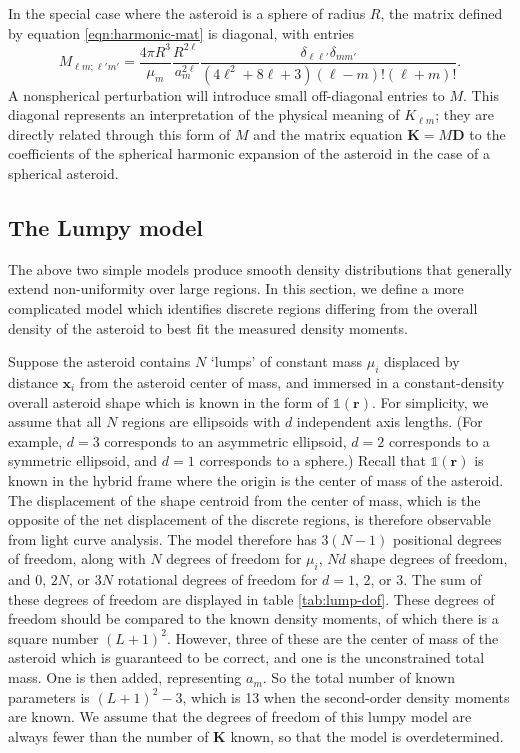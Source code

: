 \documentclass[fleqn,usenatbib]{mnras}
\begin{document}
In the special case where the asteroid is a sphere of radius $R$, the matrix defined by equation \ref{eqn:harmonic-mat} is diagonal, with entries 
\begin{equation}
  M_{\ell m; \ell' m'} = \frac{4\pi R^3}{\mu_m} \frac{R^{2\ell}}{a_m^{2\ell}} \frac{\delta_{\ell \ell'} \delta_{m m'}}{(4\ell^2 + 8\ell + 3)(\ell - m)!(\ell+m)!}.
\end{equation}
A nonspherical perturbation will introduce small off-diagonal entries to $M$. This diagonal represents an interpretation of the physical meaning of $K_{\ell m}$; they are directly related through this form of $M$ and the matrix equation $\bm K = M \bm D$ to the coefficients of the spherical harmonic expansion of the asteroid in the case of a spherical asteroid.



\subsection{The Lumpy model}

The above two simple models produce smooth density distributions that generally extend non-uniformity over large regions. In this section, we define a more complicated model which identifies discrete regions differing from the overall density of the asteroid to best fit the measured density moments.

Suppose the asteroid contains $N$ `lumps' of constant mass $\mu_i$ displaced by distance $\bm x_i$ from the asteroid center of mass, and immersed in a constant-density overall asteroid shape which is known in the form of $\mathds{1}(\bm r)$. For simplicity, we assume that all $N$ regions are ellipsoids with $d$ independent axis lengths. (For example, $d=3$ corresponds to an asymmetric ellipsoid, $d=2$ corresponds to a symmetric ellipsoid, and $d=1$ corresponds to a sphere.) Recall that $\mathds{1}(\bm r)$ is known in the hybrid frame where the origin is the center of mass of the asteroid. The displacement of the shape centroid from the center of mass, which is the opposite of the net displacement of the discrete regions, is therefore observable from light curve analysis. The model therefore has $3(N-1)$ positional degrees of freedom, along with $N$ degrees of freedom for $\mu_i$, $Nd$ shape degrees of freedom, and 0, $2N$, or $3N$ rotational degrees of freedom for $d=1$, 2, or 3. The sum of these degrees of freedom are displayed in table \ref{tab:lump-dof}. These degrees of freedom should be compared to the known density moments, of which there is a square number $(L+1)^2$. However, three of these are the center of mass of the asteroid which is guaranteed to be correct, and one is the unconstrained total mass. One is then added, representing $a_m$. So the total number of known parameters is $(L+1)^2 - 3$, which is 13 when the second-order density moments are known. We assume that the degrees of freedom of this lumpy model are always fewer than the number of $\bm K$ known, so that the model is overdetermined.
\end{document}
